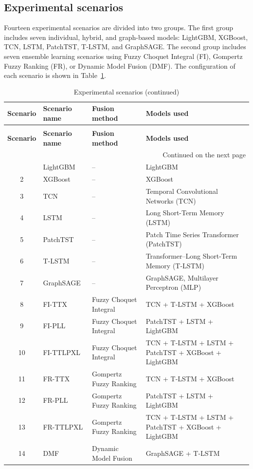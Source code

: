 \documentclass[10pt,twoside]{article}
\newcommand{\fairsmallfont}{\fontsize{9pt}{11pt}\selectfont}
\begin{document}
\subsection{Experimental scenarios}
Fourteen experimental scenarios are divided into two groups. The first group includes seven individual, hybrid, and graph-based models: LightGBM, XGBoost, TCN, LSTM, PatchTST, T-LSTM, and GraphSAGE. The second group includes seven ensemble learning scenarios using Fuzzy Choquet Integral (FI), Gompertz Fuzzy Ranking (FR), or Dynamic Model Fusion (DMF). The configuration of each scenario is shown in Table~\ref{tab:experimental_scenarios}.
\begingroup
\centering
\begin{longtable}{c l l >{\raggedright\arraybackslash}p{6.5cm}}
\caption{Experimental scenarios}
\label{tab:experimental_scenarios}\\
\hline
\textbf{Scenario} & \textbf{Scenario name} & \textbf{Fusion method} & \textbf{Models used} \\
\hline
\endfirsthead
\caption[]{Experimental scenarios (continued)}\\
\hline
\textbf{Scenario} & \textbf{Scenario name} & \textbf{Fusion method} & \textbf{Models used} \\
\hline
\endhead
\hline
\multicolumn{4}{r}{\fairsmallfont Continued on the next page}\\
\endfoot
\hline
\endlastfoot
1 & LightGBM & -- & LightGBM \\
2 & XGBoost & -- & XGBoost \\
3 & TCN & -- & Temporal Convolutional Networks (TCN) \\
4 & LSTM & -- & Long Short-Term Memory (LSTM) \\
5 & PatchTST & -- & Patch Time Series Transformer (PatchTST) \\
6 & T-LSTM & -- & Transformer--Long Short-Term Memory (T-LSTM) \\
7 & GraphSAGE & -- & GraphSAGE, Multilayer Perceptron (MLP) \\
8 & FI-TTX & Fuzzy Choquet Integral & TCN + T-LSTM + XGBoost \\
9 & FI-PLL & Fuzzy Choquet Integral & PatchTST + LSTM + LightGBM \\
10 & FI-TTLPXL & Fuzzy Choquet Integral & TCN + T-LSTM + LSTM + PatchTST + XGBoost + LightGBM \\
11 & FR-TTX & Gompertz Fuzzy Ranking & TCN + T-LSTM + XGBoost \\
12 & FR-PLL & Gompertz Fuzzy Ranking & PatchTST + LSTM + LightGBM \\
13 & FR-TTLPXL & Gompertz Fuzzy Ranking & TCN + T-LSTM + LSTM + PatchTST + XGBoost + LightGBM \\
14 & DMF & Dynamic Model Fusion & GraphSAGE + T-LSTM \\
\end{longtable}
\endgroup
\end{document}
